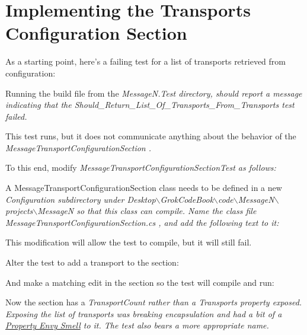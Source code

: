 \section{Implementing the Transports Configuration Section}
As a starting point, here's a failing test for a list of transports retrieved from configuration:



Running the build file from the \em MessageN.Test \em directory, should report a message indicating that the \em Should\_Return\_List\_Of\_Transports\_From\_Transports \em test failed.

This test runs, but it does not communicate anything about the behavior of the \em MessageTransportConfigurationSection \em.

To this end, modify \em MessageTransportConfigurationSectionTest \em as follows:



A MessageTransportConfigurationSection class needs to be defined in a new \em Configuration \em subdirectory under \em Desktop$\backslash$GrokCodeBook$\backslash$code$\backslash$MessageN$\backslash$projects$\backslash$MessageN \em so that this class can compile. Name the class file \em MessageTransportConfigurationSection.cs \em, and add the following text to it:



This modification will allow the test to compile, but it will still fail.

Alter the test to add a transport to the section:



And make a matching edit in the section so the test will compile and run:



Now the section has a \em TransportCount \em rather than a \em Transports \em property exposed. Exposing the list of transports was breaking encapsulation and had a bit of a \href{http://c2.com/cgi/wiki?FeatureEnvySmell}{Property Envy Smell} to it. The test also bears a more appropriate name.

